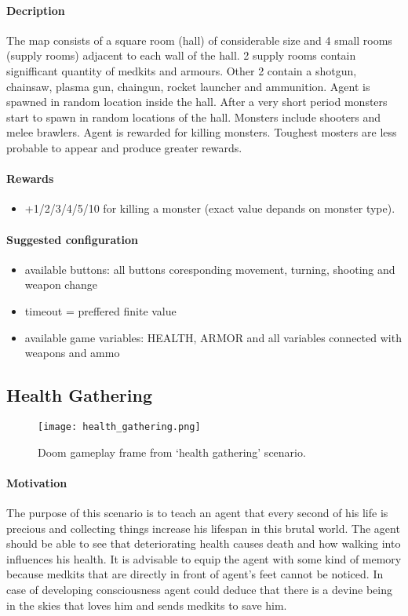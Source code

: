 		\paragraph{Decription}
			The map consists of a square room (hall) of considerable size and 4 small rooms (supply rooms) adjacent to each wall of the hall. 2 supply rooms contain signifficant quantity of medkits and armours. Other 2 contain a shotgun, chainsaw, plasma gun, chaingun, rocket launcher and ammunition. Agent is spawned in random location inside the hall. After a very short period monsters start to spawn in random locations of the hall. Monsters include shooters and melee brawlers. Agent is rewarded for killing monsters. Toughest mosters are less probable to appear and produce greater rewards.
		\paragraph{Rewards}
			\begin{itemize}
				\item +1/2/3/4/5/10 for killing a monster (exact value depands on monster type).
			\end{itemize}
		
		\paragraph{Suggested configuration}
			\begin{itemize}
				\item available buttons: all buttons coresponding movement, turning, shooting and weapon change 
				\item timeout = preffered finite value
				\item available game variables: HEALTH, ARMOR and all variables connected with weapons and ammo
			\end{itemize}		
	\newpage

	\subsection{Health Gathering}
		\begin{figure}
			\centering
			\texttt{[image: health\_gathering.png]}
			\caption{Doom gameplay frame from `health gathering' scenario.}\label{fig:health_gathering}
		\end{figure}
		\paragraph{Motivation}
			The purpose of this scenario is to teach an agent that every second of his life is precious and collecting things increase his lifespan in this brutal world. The agent should be able to see that deteriorating health causes death and how walking into influences his health. It is advisable to equip the agent with some kind of memory because medkits that are directly in front of agent's feet cannot be noticed. In case of developing consciousness agent could deduce that there is a devine being in the skies that loves him and sends medkits to save him.

